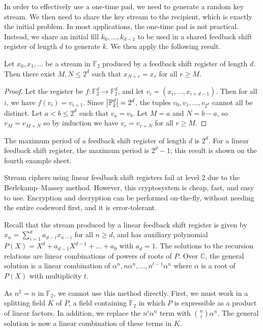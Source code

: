 In order to effectively use a one-time pad, we need to generate a random key stream.
We then need to share the key stream to the recipient, which is exactly the initial problem.
In most applications, the one-time pad is not practical.
Instead, we share an initial fill \( k_0, \dots, k_{d-1} \) to be used in a shared feedback shift register of length \( d \) to generate \( k \).
We then apply the following result.
\begin{lemma}
    Let \( x_0, x_1, \dots \) be a stream in \( \mathbb F_2 \) produced by a feedback shift register of length \( d \).
    Then there exist \( M, N \leq 2^d \) such that \( x_{N+r} = x_{r} \) for all \( r \geq M \).
\end{lemma}
\begin{proof}
    Let the register be \( f \colon \mathbb F_2^d \to \mathbb F_2^d \), and let \( v_i = (x_i, \dots, x_{i+d-1}) \).
    Then for all \( i \), we have \( f(v_i) = v_{i+1} \).
    Since \( \abs{\mathbb F_2^d} = 2^d \), the tuples \( v_0, v_1, \dots, v_{2^d} \) cannot all be distinct.
    Let \( a < b \leq 2^d \) such that \( v_a = v_b \).
    Let \( M = a \) and \( N = b - a \), so \( v_M = v_{M+N} \) so by induction we have \( v_r = v_{r+N} \) for all \( r \geq M \).
\end{proof}
\begin{remark}
    The maximum period of a feedback shift register of length \( d \) is \( 2^d \).
    For a linear feedback shift register, the maximum period is \( 2^d - 1 \); this result is shown on the fourth example sheet.

    Stream ciphers using linear feedback shift registers fail at level 2 due to the Berlekamp--Massey method.
    However, this cryptosystem is cheap, fast, and easy to use.
    Encryption and decryption can be performed on-the-fly, without needing the entire codeword first, and it is error-tolerant.
\end{remark}
Recall that the stream produced by a linear feedback shift register is given by \( x_n = \sum_{i=1}^d a_{d-i} x_{n-i} \) for all \( n \geq d \), and has auxiliary polynomial \( P(X) = X^d + a_{d-1}X^{d-1} + \dots + a_0 \) with \( a_d = 1 \).
The solutions to the recursion relations are linear combinations of powers of roots of \( P \).
Over \( \mathbb C \), the general solution is a linear combination of \( \alpha^n, n\alpha^n, \dots, n^{t-1} \alpha^n \) where \( \alpha \) is a root of \( P(X) \) with multiplicity \( t \).

As \( n^2 = n \) in \( \mathbb F_2 \), we cannot use this method directly.
First, we must work in a splitting field \( K \) of \( P \), a field containing \( \mathbb F_2 \) in which \( P \) is expressible as a product of linear factors.
In addition, we replace the \( n^i \alpha^n \) term with \( \binom{n}{i} \alpha^n \).
The general solution is now a linear combination of these terms in \( K \).

